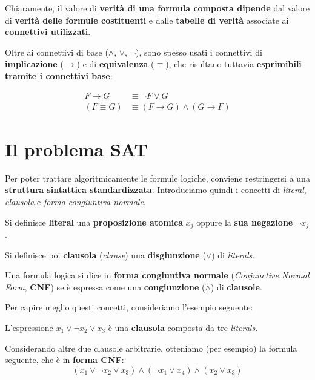 Chiaramente, il valore di \textbf{verità di una formula composta dipende} dal valore di 
\textbf{verità delle formule costituenti} e dalle \textbf{tabelle di verità} associate 
ai \textbf{connettivi utilizzati}.

Oltre ai connettivi di base ($\land$, $\lor$, $\neg$), sono spesso usati i 
connettivi di \textbf{implicazione} ($\to$) e di \textbf{equivalenza} ($\equiv$), 
che risultano tuttavia \textbf{esprimibili tramite i connettivi base}:

\begin{remark}
    \[
        \begin{aligned}
            F \to G &\equiv \neg F \lor G \\
            (F \equiv G) &\equiv (F \to G) \land (G \to F)
        \end{aligned}
    \]
\end{remark}

\section{Il problema SAT}

Per poter trattare algoritmicamente le formule logiche, conviene restringersi a una 
\textbf{struttura sintattica standardizzata}. Introduciamo quindi i concetti di 
\textit{literal}, \textit{clausola} e \textit{forma congiuntiva normale}.

\begin{definition}
    Si definisce \textbf{literal} una \textbf{proposizione atomica} $x_j$ oppure la 
    \textbf{sua negazione} $\neg x_j$.

    Si definisce poi \textbf{clausola} (\textit{clause}) una \textbf{disgiunzione} ($\lor$) 
    di \textit{literals}.
\end{definition}

\begin{definition}
    Una formula logica si dice in \textbf{forma congiuntiva normale} 
    (\textit{Conjunctive Normal Form}, \textbf{CNF}) se è espressa come una 
    \textbf{congiunzione} ($\land$) di \textbf{clausole}.
\end{definition}

Per capire meglio questi concetti, consideriamo l'esempio seguente:

\begin{exa}
    L'espressione $x_1 \lor \neg x_2 \lor x_3$ è una \textbf{clausola} composta da tre 
    \textit{literals}. 

    Considerando altre due clausole arbitrarie, otteniamo (per esempio) la formula seguente, 
    che è in \textbf{forma CNF}:
    \[
        (x_1 \lor \neg x_2 \lor x_3) \land (\neg x_1 \lor x_4) \land (x_2 \lor x_3)
    \]
\end{exa}


